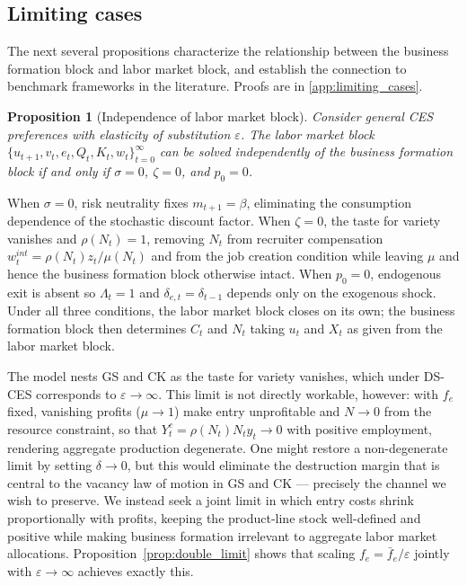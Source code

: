 \documentclass[authoryear, review, 12pt]{elsarticle}
\newtheorem{proposition}{Proposition}
\begin{document}
\subsection{Limiting cases}

The next several propositions characterize the 
relationship between the business formation block 
and labor market block, and establish the connection 
to benchmark frameworks in the literature. Proofs 
are in \ref{app:limiting_cases}.

\begin{proposition}[Independence of labor market block]
	\label{prop:independence}
	Consider general CES preferences with elasticity of 
	substitution $\varepsilon$. The labor market 
	block $\{u_{t+1}, v_t, e_t, Q_t, K_t, w_t\}_{t=0}^{\infty}$ 
	can be solved independently of the business formation 
	block if and only if $\sigma=0$, $\zeta=0$, and $p_0=0$.
\end{proposition}

When $\sigma=0$, risk neutrality fixes $m_{t+1}=\beta$, 
eliminating the consumption dependence of the stochastic 
discount factor. When $\zeta=0$, the taste for variety 
vanishes and $\rho(N_t)=1$, removing $N_t$ from recruiter 
compensation $w_t^{int}=\rho(N_t)z_t/\mu(N_t)$ and from 
the job creation condition while leaving $\mu$ and hence 
the business formation block otherwise intact. When 
$p_0=0$, endogenous exit is absent so $\Lambda_t=1$ and 
$\delta_{e,t}=\delta_{t-1}$ depends only on the exogenous 
shock. Under all three conditions, the labor market block 
closes on its own; the business formation block then 
determines $C_t$ and $N_t$ taking $u_t$ and $X_t$ as 
given from the labor market block.

The model nests GS and CK as the taste for variety 
vanishes, which under DS-CES corresponds to 
$\varepsilon\to\infty$. This limit is not directly 
workable, however: with $f_e$ fixed, vanishing profits 
($\mu\to 1$) make entry unprofitable and $N\to 0$ from 
the resource constraint, so that $Y_t^c=\rho(N_t)N_t y_t
\to 0$ with positive employment, rendering aggregate 
production degenerate. One might restore a non-degenerate 
limit by setting $\delta\to 0$, but this would eliminate 
the destruction margin that is central to the vacancy 
law of motion in GS and CK --- precisely the channel we 
wish to preserve. We instead seek a joint limit in which 
entry costs shrink proportionally with profits, keeping 
the product-line stock well-defined and positive while 
making business formation irrelevant to aggregate labor 
market allocations. Proposition~\ref{prop:double_limit} 
shows that scaling $f_e=\bar{f}_e/\varepsilon$ jointly 
with $\varepsilon\to\infty$ achieves exactly this.
\end{document}

